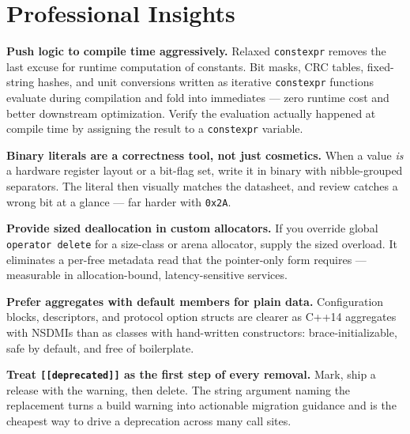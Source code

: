 \section{Professional Insights}
\label{sec:c14-core-insights}

\textbf{Push logic to compile time aggressively.} Relaxed \texttt{constexpr} removes the last excuse for runtime computation of constants. Bit masks, CRC tables, fixed-string hashes, and unit conversions written as iterative \texttt{constexpr} functions evaluate during compilation and fold into immediates --- zero runtime cost and better downstream optimization. Verify the evaluation actually happened at compile time by assigning the result to a \texttt{constexpr} variable.

\textbf{Binary literals are a correctness tool, not just cosmetics.} When a value \emph{is} a hardware register layout or a bit-flag set, write it in binary with nibble-grouped separators. The literal then visually matches the datasheet, and review catches a wrong bit at a glance --- far harder with \texttt{0x2A}.

\textbf{Provide sized deallocation in custom allocators.} If you override global \texttt{operator delete} for a size-class or arena allocator, supply the sized overload. It eliminates a per-free metadata read that the pointer-only form requires --- measurable in allocation-bound, latency-sensitive services.

\textbf{Prefer aggregates with default members for plain data.} Configuration blocks, descriptors, and protocol option structs are clearer as C++14 aggregates with NSDMIs than as classes with hand-written constructors: brace-initializable, safe by default, and free of boilerplate.

\textbf{Treat \texttt{[[deprecated]]} as the first step of every removal.} Mark, ship a release with the warning, then delete. The string argument naming the replacement turns a build warning into actionable migration guidance and is the cheapest way to drive a deprecation across many call sites.
